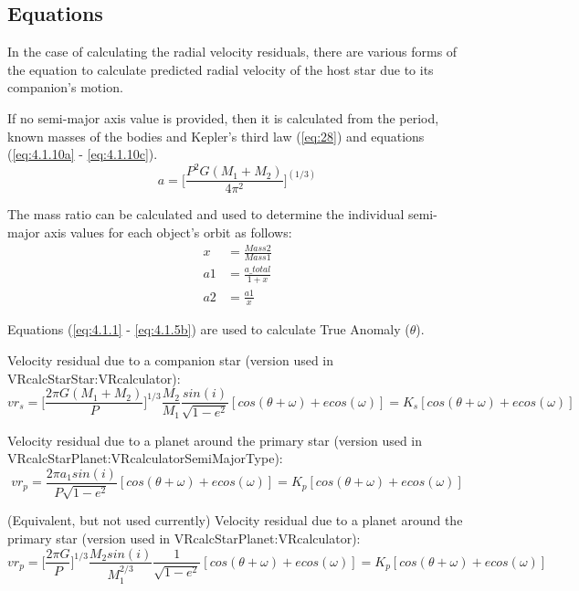 \documentclass[10pt,preprint]{aastex}
\begin{document}
\subsection{Equations}
In the case of calculating the radial velocity residuals, there are various forms of the equation to calculate predicted radial velocity of the host star due to its companion's motion.

If no semi-major axis value is provided, then it is calculated from the period, known masses of the bodies and Kepler's third law (\ref{eq:28}) and equations (\ref{eq:4.1.10a} - \ref{eq:4.1.10c}).
\begin{equation}\label{eq:28}
a = \bigg[\frac{P^2G(M_1+M_2)}{4\pi^2} \bigg]^{(1/3)}
\end{equation}

The mass ratio can be calculated and used to determine the individual semi-major axis values for each object's orbit as follows:
\begin{subequations}
\begin{align}
\label{eq:4.1.10a}
x& = \frac{Mass2}{Mass1}\\
\label{eq:4.1.10b}
a1& = \frac{a\_total}{1+x}\\
\label{eq:4.1.10c}
a2& = \frac{a1}{x}
\end{align}
\end{subequations}

Equations (\ref{eq:4.1.1} - \ref{eq:4.1.5b}) are used to calculate True Anomaly ($\theta$).

Velocity residual due to a companion star (version used in VRcalcStarStar:VRcalculator):
\begin{equation}\label{eq:30}
vr_s = \bigg[\frac{2\pi G(M_1+M_2)}{P}\bigg]^{1/3}\frac{M_2}{M_1}\frac{sin(i)}{\sqrt{1-e^2}}[cos(\theta+\omega)+e cos(\omega)] = K_s[cos(\theta+\omega)+e cos(\omega)]
\end{equation}

Velocity residual due to a planet around the primary star (version used in VRcalcStarPlanet:VRcalculatorSemiMajorType):
\begin{equation}\label{eq:29}
vr_p = \frac{2\pi a_1sin(i)}{P\sqrt{1-e^2}}[cos(\theta+\omega)+e cos(\omega)]= K_p[cos(\theta+\omega)+e cos(\omega)]
\end{equation}

(Equivalent, but not used currently) Velocity residual due to a planet around the primary star (version used in VRcalcStarPlanet:VRcalculator):
\begin{equation}\label{eq:31}
vr_p = \bigg[\frac{2\pi G}{P}\bigg]^{1/3}\frac{M_2sin(i)}{M_1^{2/3}}\frac{1}{\sqrt{1-e^2}}[cos(\theta+\omega)+e cos(\omega)] = K_p[cos(\theta+\omega)+e cos(\omega)]
\end{equation}
\end{document}
